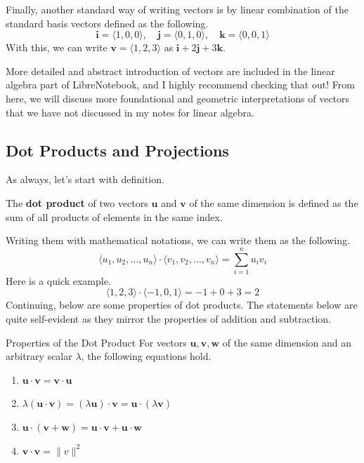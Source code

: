 \documentclass[../../../main.tex]{subfiles}
\begin{document}
Finally, another standard way of writing vectors is by linear
combination of the standard basis vectors defined as the following.
\[
\mathbf{i} = \langle 1, 0, 0 \rangle, \quad
\mathbf{j} = \langle 0, 1, 0 \rangle, \quad
\mathbf{k} = \langle 0, 0, 1 \rangle
\]
With this, we can write $\mathbf{v} = \langle 1, 2, 3 \rangle$ as
$\mathbf{i} + 2\mathbf{j} + 3\mathbf{k}$.

More detailed and abstract introduction of vectors are included
in the linear algebra part of LibreNotebook, and I highly recommend
checking that out! From here, we will discuss more foundational and
geometric interpretations of vectors that we have not discussed
in my notes for linear algebra.

\subsection{Dot Products and Projections}

As always, let's start with definition.

\begin{definition}{}{}
The \textbf{dot product} of two vectors $\mathbf{u}$ and $\mathbf{v}$
of the same dimension is defined as the sum of all products of
elements in the same index.
\end{definition}

Writing them with mathematical notations, we can write them as the
following.
\[
\langle u_1, u_2, \ldots, u_n \rangle \cdot
    \langle v_1, v_2, \ldots, v_n \rangle
= \sum_{i=1}^n u_i v_i
\]
Here is a quick example.
\[
\langle 1, 2, 3 \rangle \cdot \langle -1, 0, 1 \rangle
= -1 + 0 + 3
= 2
\]
Continuing, below are some properties of dot products. The statements
below are quite self-evident as they mirror the properties of addition
and subtraction.

\begin{theorem}{}{Properties of the Dot Product}
For vectors $\mathbf{u}, \mathbf{v}, \mathbf{w}$ of the same dimension
and an arbitrary scalar $\lambda$, the following equations hold.
\begin{enumerate}
\item $\mathbf{u} \cdot \mathbf{v} = \mathbf{v} \cdot \mathbf{u}$
\item $\lambda (\mathbf{u} \cdot \mathbf{v})
= (\lambda \mathbf{u}) \cdot \mathbf{v}
= \mathbf{u} \cdot (\lambda \mathbf{v})$
\item $\mathbf{u} \cdot (\mathbf{v} + \mathbf{w})
= \mathbf{u} \cdot \mathbf{v} + \mathbf{u} \cdot \mathbf{w}$
\item $\mathbf{v} \cdot \mathbf{v} = \| v \|^2$
\end{enumerate}
\end{theorem}
\end{document}
